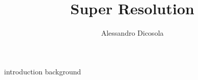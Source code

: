 \documentclass{article}
\author{Alessandro Dicosola}
\title{Super Resolution}
\begin{document}
\maketitle
\tableofcontents

{introduction}
{background}

\clearpage


\end{document}
